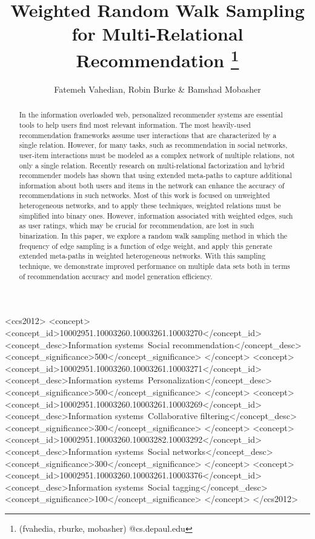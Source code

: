 \documentclass {acmart}
\begin{document}
\title{Weighted Random Walk Sampling for Multi-Relational Recommendation \footnote{(fvahedia, rburke, mobasher) @cs.depaul.edu}}


\author{Fatemeh Vahedian, Robin Burke \& Bamshad Mobasher}


\begin{abstract}
In the information overloaded web, personalized recommender systems are essential tools to help users find most relevant information. The most heavily-used recommendation frameworks assume user interactions that are characterized by a single relation. However, for many tasks, such as recommendation in social networks, user-item interactions must be modeled as a complex network of multiple relations, not only a single relation. Recently research on multi-relational factorization and hybrid recommender models has shown that using extended meta-paths to capture additional information about both users and items in the network can enhance the accuracy of recommendations in such networks. Most of this work is focused on unweighted heterogeneous networks, and to apply these techniques, weighted relations must be simplified into binary ones. However, information associated with weighted edges, such as user ratings, which may be crucial for recommendation, are lost in such binarization. In this paper, we explore a random walk sampling method in which the frequency of edge sampling is a function of edge weight, and apply this generate extended meta-paths in weighted heterogeneous networks. With this sampling technique, we demonstrate improved performance on multiple data sets both in terms of recommendation accuracy and model generation efficiency. 
\end{abstract}

%
%
\begin{CCSXML}
	<ccs2012>
	<concept>
	<concept_id>10002951.10003260.10003261.10003270</concept_id>
	<concept_desc>Information systems~Social recommendation</concept_desc>
	<concept_significance>500</concept_significance>
	</concept>
	<concept>
	<concept_id>10002951.10003260.10003261.10003271</concept_id>
	<concept_desc>Information systems~Personalization</concept_desc>
	<concept_significance>500</concept_significance>
	</concept>
	<concept>
	<concept_id>10002951.10003260.10003261.10003269</concept_id>
	<concept_desc>Information systems~Collaborative filtering</concept_desc>
	<concept_significance>300</concept_significance>
	</concept>
	<concept>
	<concept_id>10002951.10003260.10003282.10003292</concept_id>
	<concept_desc>Information systems~Social networks</concept_desc>
	<concept_significance>300</concept_significance>
	</concept>
	<concept>
	<concept_id>10002951.10003260.10003261.10003376</concept_id>
	<concept_desc>Information systems~Social tagging</concept_desc>
	<concept_significance>100</concept_significance>
	</concept>
	</ccs2012>
\end{CCSXML}
\end{document}
